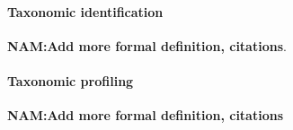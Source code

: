 \paragraph{Taxonomic identification}\label{back:taxonomic_id}
\textbf{NAM:Add more formal definition, citations}.
\paragraph{Taxonomic profiling}\label{back:taxonomic_profiling}
\textbf{NAM:Add more formal definition, citations}


% 
